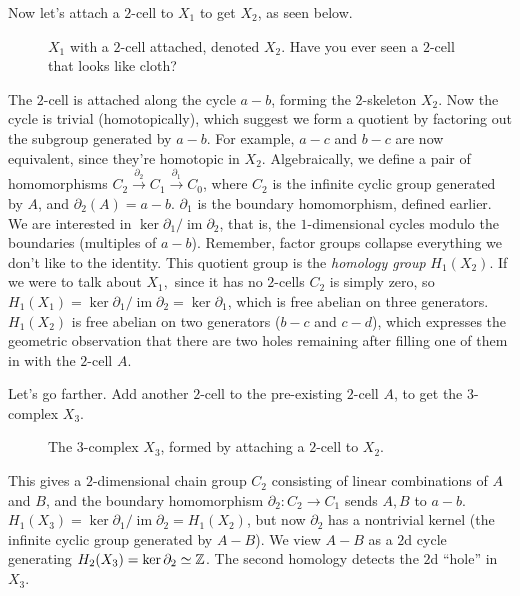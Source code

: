 Now let's attach a $2$-cell to $X_1$ to get $X_2$, as seen below.
\begin{figure}[H]
    \centering
    \caption{$X_1$ with a $2$-cell attached, denoted $X_2$. Have you ever seen a $2$-cell that looks like cloth?}
    \label{x2}
\end{figure}
The $2$-cell is attached along the cycle $a-b$, forming the $2$-skeleton $X_2$. Now the cycle is trivial (homotopically), which suggest we form a quotient by factoring out the subgroup generated by $a-b$. For example, $a-c$ and $b-c$ are now equivalent, since they're homotopic in $X_2$. Algebraically, we define a pair of homomorphisms $C_2 \overset{\partial_2}{\longrightarrow}C_1\overset{\partial_1}{\longrightarrow}C_0  $, where $C_2$ is the infinite cyclic group generated by $A$, and $\partial_2(A)=a-b$. $\partial_1 $ is the boundary homomorphism, defined earlier. We are interested in $\operatorname{ker}\partial_1 / \operatorname{im}\partial_2  $, that is, the $1$-dimensional cycles modulo the boundaries (multiples of $a-b$). Remember, factor groups collapse everything we don't like to the identity. This quotient group is the \emph{homology group} $H_1(X_2)$. If we were to talk about $X_1,$ since it has no $2$-cells $C_2$ is simply zero, so $H_1(X_1)=\ker \partial_1 / \operatorname{im}\partial_2=\ker \partial_1  $, which is free abelian on three generators. $H_1(X_2)$ is free abelian on two generators ($b-c$ and $c-d$), which expresses the geometric observation that there are two holes remaining after filling one of them in with the $2$-cell $A$.

Let's go farther. Add another $2$-cell to the pre-existing $2$-cell $A$, to get the $3$-complex $X_3$.
\begin{figure}[H]
    \centering
    \caption{The $3$-complex  $X_3$, formed by attaching a $2$-cell to $X_2$.}
    \label{x3}
\end{figure}
This gives a $2$-dimensional chain group $C_2$ consisting of linear combinations of $A$ and $ B$, and the boundary homomorphism $\partial_2 \colon C_2 \to C_1 $ sends $A,B$ to $a-b$. $H_1(X_3)=\ker \partial_1 / \operatorname{im}\partial_2  =H_1(X_2)$, but now $\partial_2 $ has a nontrivial kernel (the infinite cyclic group generated by $A-B$). We view $A-B$ as a $2$d cycle generating $H_2(X_3)=\ker \partial_2\simeq\mathbb{Z} $. The second homology detects the $2$d ``hole'' in $X_3$. 

